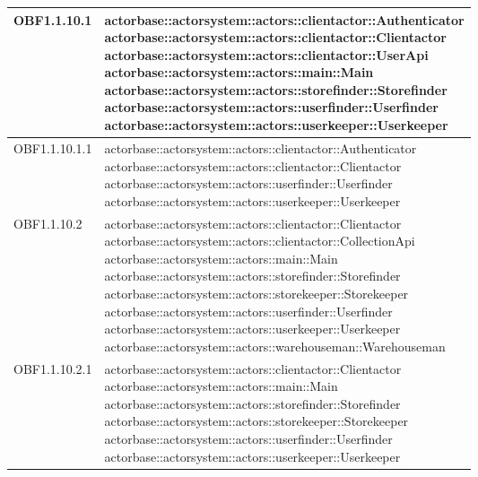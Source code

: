 \documentclass{scalatekids-article}
\begin{document}
\begin{longtable}[H]{|p{4.5cm}|p{13cm}|}
  \hline
  OBF1.1.10.1 & \multiLineCell[t]{actorbase::actorsystem::actors::clientactor::Authenticator\\actorbase::actorsystem::actors::clientactor::Clientactor\\actorbase::actorsystem::actors::clientactor::UserApi\\actorbase::actorsystem::actors::main::Main\\actorbase::actorsystem::actors::storefinder::Storefinder\\actorbase::actorsystem::actors::userfinder::Userfinder\\actorbase::actorsystem::actors::userkeeper::Userkeeper\\}\\
  \hline
  OBF1.1.10.1.1 & \multiLineCell[t]{actorbase::actorsystem::actors::clientactor::Authenticator\\actorbase::actorsystem::actors::clientactor::Clientactor\\actorbase::actorsystem::actors::userfinder::Userfinder\\actorbase::actorsystem::actors::userkeeper::Userkeeper\\}\\
  \hline
  OBF1.1.10.2 & \multiLineCell[t]{actorbase::actorsystem::actors::clientactor::Clientactor\\actorbase::actorsystem::actors::clientactor::CollectionApi\\actorbase::actorsystem::actors::main::Main\\actorbase::actorsystem::actors::storefinder::Storefinder\\actorbase::actorsystem::actors::storekeeper::Storekeeper\\actorbase::actorsystem::actors::userfinder::Userfinder\\actorbase::actorsystem::actors::userkeeper::Userkeeper\\actorbase::actorsystem::actors::warehouseman::Warehouseman\\}\\
  \hline
  OBF1.1.10.2.1 & \multiLineCell[t]{actorbase::actorsystem::actors::clientactor::Clientactor\\actorbase::actorsystem::actors::main::Main\\actorbase::actorsystem::actors::storefinder::Storefinder\\actorbase::actorsystem::actors::storekeeper::Storekeeper\\actorbase::actorsystem::actors::userfinder::Userfinder\\actorbase::actorsystem::actors::userkeeper::Userkeeper\\}\\

\end{longtable}
\end{document}
